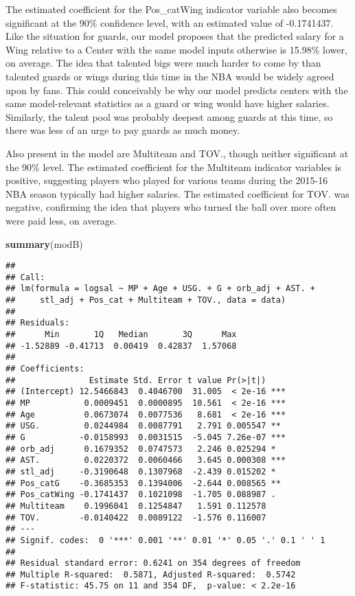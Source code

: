 \documentclass[]{article}
\newenvironment{Shaded}{\begin{snugshade}}{\end{snugshade}}
\newcommand{\KeywordTok}[1]{\textcolor[rgb]{0.13,0.29,0.53}{\textbf{#1}}}
\newcommand{\NormalTok}[1]{#1}
\begin{document}
The estimated coefficient for the Pos\_catWing indicator variable also
becomes significant at the 90\% confidence level, with an estimated
value of -0.1741437. Like the situation for guards, our model proposes
that the predicted salary for a Wing relative to a Center with the same
model inputs otherwise is 15.98\% lower, on average. The idea that
talented bigs were much harder to come by than talented guards or wings
during this time in the NBA would be widely agreed upon by fans. This
could conceivably be why our model predicts centers with the same
model-relevant statistics as a guard or wing would have higher salaries.
Similarly, the talent pool was probably deepest among guards at this
time, so there was less of an urge to pay guards as much money.

Also present in the model are Multiteam and TOV., though neither
significant at the 90\% level. The estimated coefficient for the
Multiteam indicator variables is positive, suggesting players who played
for various teams during the 2015-16 NBA season typically had higher
salaries. The estimated coefficient for TOV. was negative, confirming
the idea that players who turned the ball over more often were paid
less, on average.

\begin{Shaded}
\begin{Highlighting}[]
\KeywordTok{summary}\NormalTok{(modB)}
\end{Highlighting}
\end{Shaded}

\begin{verbatim}
## 
## Call:
## lm(formula = logsal ~ MP + Age + USG. + G + orb_adj + AST. + 
##     stl_adj + Pos_cat + Multiteam + TOV., data = data)
## 
## Residuals:
##      Min       1Q   Median       3Q      Max 
## -1.52889 -0.41713  0.00419  0.42837  1.57068 
## 
## Coefficients:
##               Estimate Std. Error t value Pr(>|t|)    
## (Intercept) 12.5466843  0.4046700  31.005  < 2e-16 ***
## MP           0.0009451  0.0000895  10.561  < 2e-16 ***
## Age          0.0673074  0.0077536   8.681  < 2e-16 ***
## USG.         0.0244984  0.0087791   2.791 0.005547 ** 
## G           -0.0158993  0.0031515  -5.045 7.26e-07 ***
## orb_adj      0.1679352  0.0747573   2.246 0.025294 *  
## AST.         0.0220372  0.0060466   3.645 0.000308 ***
## stl_adj     -0.3190648  0.1307968  -2.439 0.015202 *  
## Pos_catG    -0.3685353  0.1394006  -2.644 0.008565 ** 
## Pos_catWing -0.1741437  0.1021098  -1.705 0.088987 .  
## Multiteam    0.1996041  0.1254847   1.591 0.112578    
## TOV.        -0.0140422  0.0089122  -1.576 0.116007    
## ---
## Signif. codes:  0 '***' 0.001 '**' 0.01 '*' 0.05 '.' 0.1 ' ' 1
## 
## Residual standard error: 0.6241 on 354 degrees of freedom
## Multiple R-squared:  0.5871, Adjusted R-squared:  0.5742 
## F-statistic: 45.75 on 11 and 354 DF,  p-value: < 2.2e-16
\end{verbatim}
\end{document}

